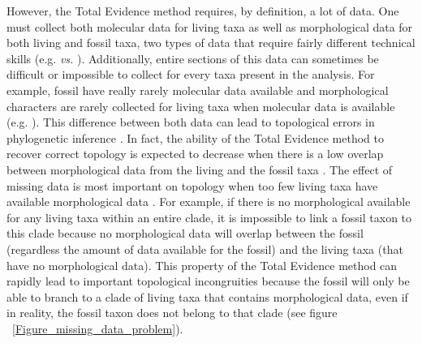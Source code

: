 \documentclass[12pt,letterpaper]{article}
\begin{document}
However, the Total Evidence method requires, by definition, a lot of data. One must collect both molecular data for living taxa as well as morphological data for both living and fossil taxa, two types of data that require fairly different technical skills (e.g. \cite{meredithimpacts2011} \textit{vs.} \cite{O'Leary08022013}). Additionally, entire sections of this data can sometimes be difficult or impossible to collect for every taxa present in the analysis. For example, fossil have really rarely molecular data available and morphological characters are rarely collected for living taxa when molecular data is available (e.g. \cite{slaterphylogenetic2013,beckancient2014}). This difference between both data can lead to topological errors in phylogenetic inference \cite{GuillermeCooper}. In fact, the ability of the Total Evidence method to recover correct topology is expected to decrease when there is a low overlap between morphological data from the living and the fossil taxa \cite{GuillermeCooper}. The effect of missing data is most important on topology when too few living taxa have available morphological data \cite{GuillermeCooper}. For example, if there is no morphological available for any living taxa within an entire clade, it is impossible to link a fossil taxon to this clade because no morphological data will overlap between the fossil (regardless the amount of data available for the fossil) and the living taxa (that have no morphological data). This property of the Total Evidence method can rapidly lead to important topological incongruities because the fossil will only be able to branch to a clade of living taxa that contains morphological data, even if in reality, the fossil taxon does not belong to that clade \cite{GuillermeCooper} (see figure ~\ref{Figure_missing_data_problem}).
\end{document}
